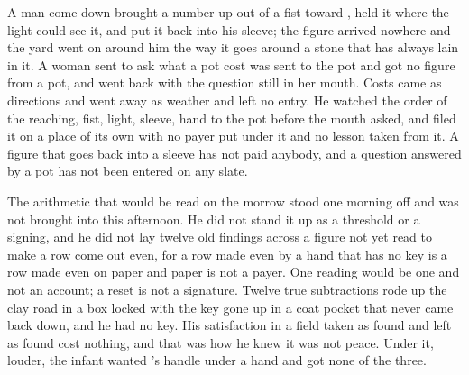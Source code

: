 A man come down  brought a number up out of a fist toward , held it where the light could see it, and put it back into his sleeve; the figure arrived nowhere and the yard went on around him the way it goes around a stone that has always lain in it. A woman sent to ask what a pot cost was sent to the pot and got no figure from a pot, and went back with the question still in her mouth. Costs came as directions and went away as weather and left no entry. He watched the order of the reaching, fist, light, sleeve, hand to the pot before the mouth asked, and filed it on a place of its own with no payer put under it and no lesson taken from it. A figure that goes back into a sleeve has not paid anybody, and a question answered by a pot has not been entered on any slate.

The arithmetic that would be read on the morrow stood one morning off and was not brought into this afternoon. He did not stand it up as a threshold or a signing, and he did not lay twelve old findings across a figure not yet read to make a row come out even, for a row made even by a hand that has no key is a row made even on paper and paper is not a payer. One reading would be one and not an account; a reset is not a signature. Twelve true subtractions rode up the clay road in a box locked with the key gone up in a coat pocket that never came back down, and he had no key. His satisfaction in a field taken as found and left as found cost nothing, and that was how he knew it was not peace. Under it, louder, the infant wanted 's handle under a hand and got none of the three.

\scenebreak

